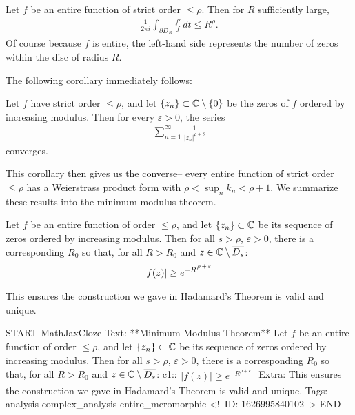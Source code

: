 \documentclass{memoir}
\begin{document}
\begin{lemma}
	Let \(f\) be an entire function of strict order \(\leq \rho \). Then for \(R\) sufficiently large,
	\begin{align*}
		\frac{1}{2\pi i}\int_{\partial D_R}\frac{f'}{f} \,d t \leq R^{\rho }.
	\end{align*}
	Of course because \(f\) is entire, the left-hand side represents the number of zeros within the disc of radius \(R\).
\end{lemma}
The following corollary immediately follows:
\begin{cor}
	Let \(f\) have strict order \(\leq \rho \), and let \(\left\{ z_n \right\} \subset \mathbb{C}\setminus\left\{ 0 \right\} \) be the zeros of \(f\) ordered by increasing modulus. Then for every \(\varepsilon>0\), the series
	\begin{align*}
		\sum_{n=1}^{\infty} \frac{1}{\left| z_n \right|^{\rho + \delta }}
	\end{align*}
	converges.
\end{cor}
This corollary then gives us the converse-- every entire function of strict order \(\leq \rho \) has a Weierstrass product form with \(\rho < \sup_{n} k_n < \rho +1\).
We summarize these results into the minimum modulus theorem.
\begin{thm}
	Let \(f\) be an entire function of order \(\leq \rho \), and let \(\left\{ z_n \right\} \subset \mathbb{C}\) be its sequence of zeros ordered by increasing modulus. Then for all \(s>\rho \), \(\varepsilon>0\), there is a corresponding \(R_0\) so that, for all \(R > R_0\) and \(z \in \mathbb{C}\setminus \overline{D_s}\):
	\begin{align*}
		\left| f(z) \right| \geq e^{-R\raisebox{+4pt}{\scalebox{0.65}{\(\,\rho +\varepsilon\)} }}
	\end{align*}
\end{thm}
This ensures the construction we gave in Hadamard's Theorem is valid and unique.

\begin{anki}
START
MathJaxCloze
Text: **Minimum Modulus Theorem**
Let \(f\) be an entire function of order \(\leq \rho \), and let \(\left\{ z_n \right\} \subset \mathbb{C}\) be its sequence of zeros ordered by increasing modulus. Then for all \(s>\rho \), \(\varepsilon>0\), there is a corresponding \(R_0\) so that, for all \(R > R_0\) and \(z \in \mathbb{C}\setminus \overline{D_s}\):
{{c1::\(\begin{align*}
        	\left| f(z) \right| \geq e^{-R ^{\rho +\varepsilon} }
        \end{align*}\)}}
Extra: This ensures the construction we gave in Hadamard's Theorem is valid and unique.
Tags: analysis complex_analysis entire_meromorphic
<!--ID: 1626995840102-->
END
\end{anki}


\end{document}
